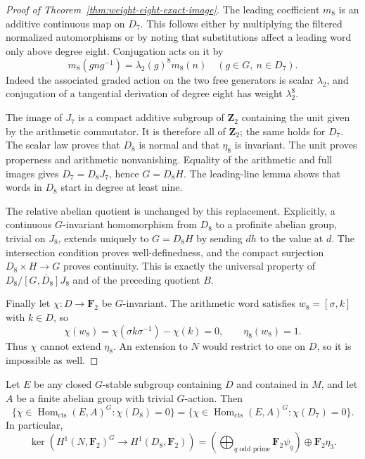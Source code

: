 \begin{proof}[Proof of Theorem~\ref{thm:weight-eight-exact-image}]
The leading coefficient $m_8$ is an additive continuous map on
$D_7$. This follows either by multiplying the filtered normalized
automorphisms or by noting that substitutions affect a leading
word only above degree eight. Conjugation acts on it by
\[
 m_8(gng^{-1})=\lambda_2(g)^8m_8(n)
 \quad(g\in G,\ n\in D_7).
\]
Indeed the associated graded action on the two free generators is
scalar $\lambda_2$, and conjugation of a tangential derivation of
degree eight has weight $\lambda_2^8$.

The image of $J_7$ is a compact additive subgroup of $\mathbf Z_2$
containing the unit given by the arithmetic commutator. It is
therefore all of $\mathbf Z_2$; the same holds for $D_7$.
The scalar law proves that $D_8$ is normal and that $\eta_8$ is
invariant. The unit proves properness and arithmetic nonvanishing.
Equality of the arithmetic and full images gives $D_7=D_8J_7$, hence
$G=D_8H$. The leading-line lemma shows that words in $D_8$ start
in degree at least nine.

The relative abelian quotient is unchanged by this replacement.
Explicitly, a continuous $G$-invariant homomorphism from $D_8$ to
a profinite abelian group, trivial on $J_8$, extends uniquely to
$G=D_8H$ by sending $dh$ to the value at $d$. The intersection
condition proves well-definedness, and the compact surjection
$D_8\times H\to G$ proves continuity. This is exactly the universal
property of $D_8/\overline{[G,D_8]J_8}$ and of the preceding quotient
$B$.

Finally let $\chi:D\to\mathbf F_2$ be $G$-invariant. The arithmetic
word satisfies $w_8=[\sigma,k]$ with $k\in D$, so
\[
 \chi(w_8)=\chi(\sigma k\sigma^{-1})-\chi(k)=0,
 \qquad \eta_8(w_8)=1.
\]
Thus $\chi$ cannot extend $\eta_8$. An extension to $N$ would
restrict to one on $D$, so it is impossible as well.
\end{proof}

\begin{corollary}\label{cor:weight-eight-original-character-kernel}
Let $E$ be any closed $G$-stable subgroup containing $D$ and contained
in $M$, and let $A$ be a finite abelian group with trivial $G$-action.
Then
\[
 \{\chi\in\operatorname{Hom}_{\mathrm{cts}}(E,A)^G:
                         \chi(D_8)=0\}
 =
 \{\chi\in\operatorname{Hom}_{\mathrm{cts}}(E,A)^G:
                         \chi(D_7)=0\}.
\]
In particular,
\[
 \ker\!\left(H^1(N,\mathbf F_2)^G
                 \longrightarrow H^1(D_8,\mathbf F_2)\right)
 =\left(\bigoplus_{q\text{ odd prime}}\mathbf F_2\psi_q\right)
       \oplus\mathbf F_2\eta_3.
\]
\end{corollary}

